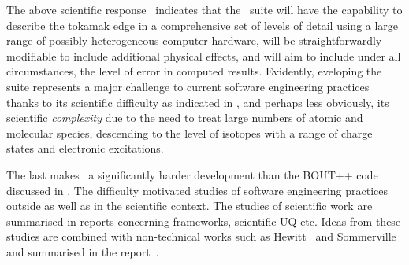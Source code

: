 
\newcommand{\red}{\itshape}
\newcommand{\blue}{\itshape}
\newcommand{\green}{\itshape}




\clearpage

\clearpage

\clearpage

\begin{subappendices}

\end{subappendices}

The above scientific response~  indicates that the \nep \ suite
will have the capability to describe the tokamak edge in a 
comprehensive set of levels of detail using a large range of possibly 
heterogeneous computer hardware, will be straightforwardly modifiable to 
include additional physical effects, and will aim to include under all 
circumstances, the level of error in computed results.
Evidently, eveloping the suite represents a major challenge to current software engineering
practices thanks to its scientific difficulty as indicated in ,
and perhaps less obviously, its scientific \emph{complexity} due to the need to treat
large numbers of atomic and molecular species, descending to the level of isotopes
with a range of charge states and electronic excitations.

The last  makes \nep \ a  significantly harder development than the BOUT++ code
discussed in . The difficulty motivated studies of software
engineering practices outside as well as in the scientific context.
The studies of scientific work are summarised in reports  concerning frameworks,
scientific UQ etc. Ideas from these studies are combined with non-technical works
such as Hewitt~\cite{hewitt} and Sommerville~\cite{sommerville} and
summarised in the report~\cite{y2d34}. 


